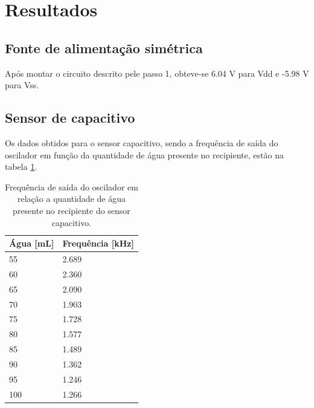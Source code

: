 \newpage
\section{Resultados}

\subsection{Fonte de alimentação simétrica}
Após montar o circuito descrito pele passo 1, obteve-se 6.04 V para Vdd e -5.98 V para Vss.


\subsection{Sensor de capacitivo}
Os dados obtidos para o sensor capacitivo, sendo a frequência de saída do oscilador em função da quantidade de água presente no recipiente, estão na tabela \ref{t_oscdata}.

\begin{small}
    \begin{table}[H]
        \begin{center}
            \caption{Frequência de saída do oscilador em relação a quantidade de água presente no recipiente do sensor capacitivo.}
            \begin{tabular}{l|l}
                \hline
                Água [mL] & Frequência [kHz] \\
                \hline
                55  & 2.689 \\
                \hline
                60  & 2.360 \\
                \hline
                65  & 2.090 \\
                \hline
                70  & 1.903 \\
                \hline
                75  & 1.728 \\
                \hline
                80  & 1.577 \\
                \hline
                85  & 1.489 \\
                \hline
                90  & 1.362 \\
                \hline
                95  & 1.246 \\
                \hline
                100 & 1.266 \\
                \hline
            \end{tabular}
            \label{t_oscdata}
        \end{center}
    \end{table}
\end{small}

